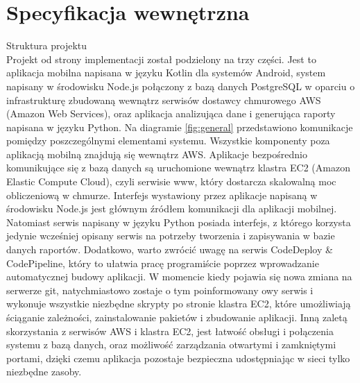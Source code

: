 \documentclass[a4paper,twoside,12pt]{book}
\begin{document}
\chapter{Specyfikacja wewnętrzna}

\begin{description}
\item Struktura projektu  \hfill \\
Projekt od strony implementacji został podzielony na trzy części. Jest to aplikacja mobilna napisana w języku Kotlin dla systemów Android, system napisany w środowisku Node.js połączony z bazą danych PostgreSQL w oparciu o infrastrukturę zbudowaną wewnątrz serwisów dostawcy chmurowego AWS (Amazon Web Services), oraz aplikacja analizująca dane i generująca raporty napisana w języku Python. Na diagramie \ref{fig:general} przedstawiono komunikacje pomiędzy poszczególnymi elementami systemu. Wszystkie komponenty poza aplikacją mobilną znajdują się wewnątrz AWS. Aplikacje bezpośrednio komunikujące się z bazą danych są uruchomione wewnątrz klastra EC2 (Amazon Elastic Compute Cloud)\cite{ec2}, czyli serwisie www, który dostarcza skalowalną moc obliczeniową w chmurze. Interfejs wystawiony przez aplikacje napisaną w środowisku Node.js jest głównym źródłem komunikacji dla aplikacji mobilnej. Natomiast serwis napisany w języku Python posiada interfejs, z którego korzysta jedynie wcześniej opisany serwis na potrzeby tworzenia i zapisywania w bazie danych raportów. Dodatkowo, warto zwrócić uwagę na serwis CodeDeploy \& CodePipeline, który to ułatwia pracę programiście poprzez wprowadzanie automatycznej budowy aplikacji. W momencie kiedy pojawia się nowa zmiana na serwerze git, natychmiastowo zostaje o tym poinformowany owy serwis i wykonuje wszystkie niezbędne skrypty po stronie klastra EC2, które umożliwiają ściąganie zależności, zainstalowanie pakietów i zbudowanie aplikacji. Inną zaletą skorzystania z serwisów AWS i klastra EC2, jest łatwość obsługi i połączenia systemu z bazą danych, oraz możliwość zarządzania otwartymi i zamkniętymi portami, dzięki czemu aplikacja pozostaje bezpieczna udostępniając w sieci tylko niezbędne zasoby.      


\end{description}
\end{document}
